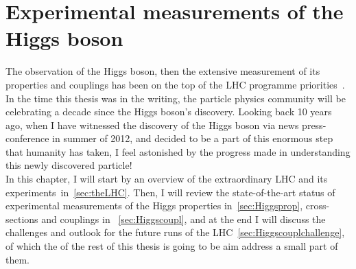 \chapter{Experimental measurements of the Higgs boson }\label{chap:HiggsConstr}
The observation of the Higgs boson, then the extensive measurement of its properties and couplings has been on the top of the LHC programme priorities~\cite{ellis2000physics}. In the time this thesis was in the writing, the particle physics community will be celebrating a decade since the Higgs boson's discovery. Looking back 10 years ago, when I have witnessed the discovery of the Higgs boson via news press-conference in summer of 2012, and decided to be a part of this enormous step that humanity has taken, 
I feel astonished by the progress made in understanding this newly discovered particle!  \\ In this chapter, I will start by an overview of the extraordinary LHC and its experiments~in~\autoref{sec:theLHC}. Then, I will review the state-of-the-art status of experimental measurements of the Higgs properties in~\autoref{sec:Higgsprop}, cross-sections  and couplings in ~\autoref{sec:Higgscoupl}, and at the end I will discuss the challenges and outlook for the future runs of the LHC~\autoref{sec:Higgscouplchallenge}, of which the of the rest of this thesis is going to be aim address a small part of them.
